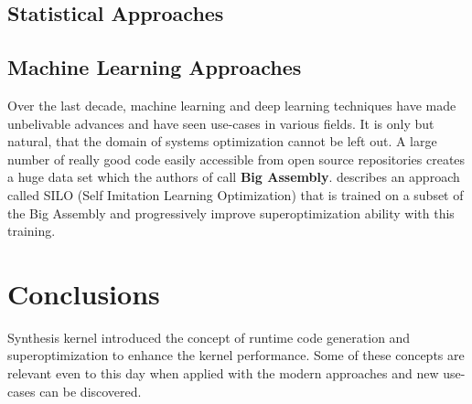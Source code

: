 \documentclass[sigconf]{acmart}
\begin{document}
\subsection{Statistical Approaches}

\cite{stochastic}

\subsection{Machine Learning Approaches}

Over the last decade, machine learning and deep learning techniques have made unbelivable advances and have seen use-cases in various fields. It is only but natural, that the domain of systems optimization cannot be left out. A large number of really good code easily accessible from open source repositories creates a huge data set which the authors of \cite{realworld} call \textbf{Big Assembly}. \cite{realworld} describes an approach called SILO (Self Imitation Learning Optimization) that is trained on a subset of the Big Assembly and progressively improve superoptimization ability with this training. 

\cite{realworld}


\section{Conclusions}

Synthesis kernel introduced the concept of runtime code generation and superoptimization to enhance the kernel performance. Some of these concepts are relevant even to this day when applied with the modern approaches and new use-cases can be discovered. 






\end{document}
